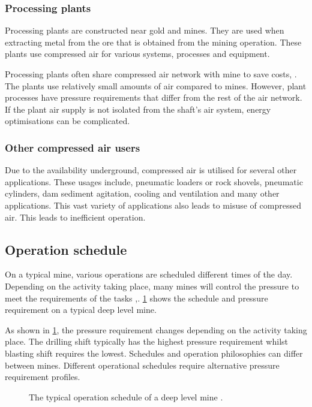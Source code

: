 \subsubsection{Processing plants}
Processing plants are constructed near gold and mines. They are used when extracting metal from the ore that is obtained from the mining operation. These plants use compressed air for various systems, processes and equipment. 
\par 
Processing plants often share compressed air network with mine to save costs, \cite{Marais2012PhD}. The plants use relatively small amounts of air compared to mines. However, plant processes have pressure requirements that differ from the rest of the air network. If the plant air supply is not isolated from the shaft's air system, energy optimisations can be complicated. 
\subsubsection{Other compressed air users}
Due to the availability underground, compressed air is utilised for several other applications. These usages include, pneumatic loaders or rock shovels, pneumatic cylinders, dam sediment agitation, cooling and ventilation and many other applications. This vast variety of applications also leads to misuse of compressed air. This leads to inefficient operation.
\subsection{Operation schedule}
On a typical mine, various operations are scheduled different times of the day. Depending on the activity taking place, many mines will control the pressure to meet the requirements of the tasks \cite{Kriel2014Masters},\cite{Marais2012PhD}. \cref{fig: Mining schedule} shows the schedule and pressure requirement on a typical deep level mine.\par 
As shown in \cref{fig: Mining schedule}, the pressure requirement changes depending on the activity taking place. The drilling shift typically has the highest pressure requirement whilst blasting shift requires the lowest. Schedules and operation philosophies can differ between mines. Different operational schedules require alternative pressure requirement profiles.
\begin{figure}[h]
	\centering
	\fbox{}
	\caption[A typical operation schedule of a deep level mine.]{The typical operation schedule of a deep level mine \cite{Kriel2014Masters}.}
	\label{fig: Mining schedule}
\end{figure}
